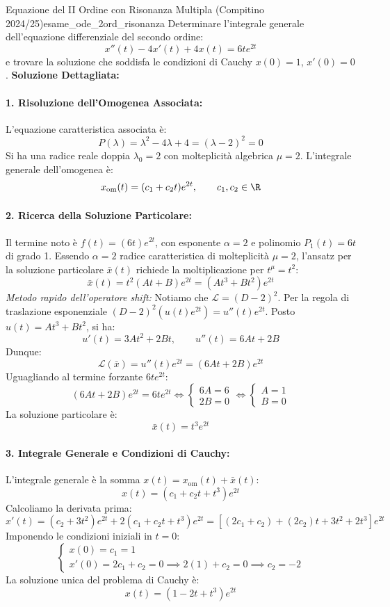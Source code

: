 \begin{esempio}{Equazione del II Ordine con Risonanza Multipla (Compitino 2024/25)}{esame_ode_2ord_risonanza}
Determinare l'integrale generale dell'equazione differenziale del secondo ordine:
\[
    x''(t) - 4x'(t) + 4x(t) = 6t e^{2t}
\]
e trovare la soluzione che soddisfa le condizioni di Cauchy $x(0) = 1$, $x'(0) = 0$.
\tcblower
\textbf{Soluzione Dettagliata:}

\paragraph{1. Risoluzione dell'Omogenea Associata:}
L'equazione caratteristica associata è:
\[
    P(\lambda) = \lambda^2 - 4\lambda + 4 = (\lambda - 2)^2 = 0
\]
Si ha una radice reale doppia $\lambda_0 = 2$ con molteplicità algebrica $\mu = 2$.
L'integrale generale dell'omogenea è:
\[
    x_{\text{om}}(t) = (c_1 + c_2 t)e^{2t}, \qquad c_1, c_2 \in \R
\]

\paragraph{2. Ricerca della Soluzione Particolare:}
Il termine noto è $f(t) = (6t)e^{2t}$, con esponente $\alpha = 2$ e polinomio $P_1(t) = 6t$ di grado 1.
Essendo $\alpha = 2$ radice caratteristica di molteplicità $\mu = 2$, l'ansatz per la soluzione particolare $\bar{x}(t)$ richiede la moltiplicazione per $t^\mu = t^2$:
\[
    \bar{x}(t) = t^2 (At + B) e^{2t} = (At^3 + Bt^2)e^{2t}
\]
\textit{Metodo rapido dell'operatore shift:}
Notiamo che $\mathcal{L} = (D - 2)^2$. Per la regola di traslazione esponenziale $(D - 2)^2 (u(t)e^{2t}) = u''(t)e^{2t}$.
Posto $u(t) = At^3 + Bt^2$, si ha:
\[
    u'(t) = 3At^2 + 2Bt, \qquad u''(t) = 6At + 2B
\]
Dunque:
\[
    \mathcal{L}(\bar{x}) = u''(t)e^{2t} = (6At + 2B)e^{2t}
\]
Uguagliando al termine forzante $6te^{2t}$:
\[
    (6At + 2B)e^{2t} = 6te^{2t} \iff \begin{cases} 6A = 6 \\ 2B = 0 \end{cases} \iff \begin{cases} A = 1 \\ B = 0 \end{cases}
\]
La soluzione particolare è:
\[
    \bar{x}(t) = t^3 e^{2t}
\]

\paragraph{3. Integrale Generale e Condizioni di Cauchy:}
L'integrale generale è la somma $x(t) = x_{\text{om}}(t) + \bar{x}(t)$:
\[
    x(t) = (c_1 + c_2 t + t^3)e^{2t}
\]
Calcoliamo la derivata prima:
\[
    x'(t) = (c_2 + 3t^2)e^{2t} + 2(c_1 + c_2 t + t^3)e^{2t} = \left[ (2c_1 + c_2) + (2c_2)t + 3t^2 + 2t^3 \right]e^{2t}
\]
Imponendo le condizioni iniziali in $t = 0$:
\[
    \begin{cases}
        x(0) = c_1 = 1 \\
        x'(0) = 2c_1 + c_2 = 0 \implies 2(1) + c_2 = 0 \implies c_2 = -2
    \end{cases}
\]
La soluzione unica del problema di Cauchy è:
\[
    x(t) = (1 - 2t + t^3)e^{2t}
\]
\end{esempio}

